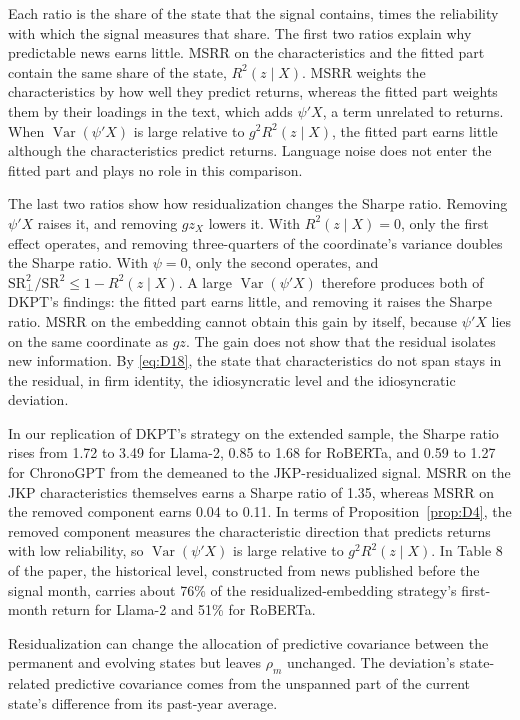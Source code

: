\documentclass[11pt,letterpaper]{article}
\theoremstyle{remark}
\DeclareMathOperator{\Var}{Var}
\begin{document}
Each ratio is the share of the state that the signal contains, times the reliability with which the signal measures that share. The first two ratios explain why predictable news earns little. MSRR on the characteristics and the fitted part contain the same share of the state, $R^2(z\mid X)$. MSRR weights the characteristics by how well they predict returns, whereas the fitted part weights them by their loadings in the text, which adds $\psi'X$, a term unrelated to returns. When $\Var(\psi'X)$ is large relative to $g^2R^2(z\mid X)$, the fitted part earns little although the characteristics predict returns. Language noise does not enter the fitted part and plays no role in this comparison.

The last two ratios show how residualization changes the Sharpe ratio. Removing $\psi'X$ raises it, and removing $gz_X$ lowers it. With $R^2(z\mid X)=0$, only the first effect operates, and removing three-quarters of the coordinate's variance doubles the Sharpe ratio. With $\psi=0$, only the second operates, and $\mathrm{SR}_\perp^2/\mathrm{SR}^2\le1-R^2(z\mid X)$. A large $\Var(\psi'X)$ therefore produces both of DKPT's findings: the fitted part earns little, and removing it raises the Sharpe ratio. MSRR on the embedding cannot obtain this gain by itself, because $\psi'X$ lies on the same coordinate as $gz$. The gain does not show that the residual isolates new information. By \eqref{eq:D18}, the state that characteristics do not span stays in the residual, in firm identity, the idiosyncratic level and the idiosyncratic deviation.

In our replication of DKPT's strategy on the extended sample, the Sharpe ratio rises from 1.72 to 3.49 for Llama-2, 0.85 to 1.68 for RoBERTa, and 0.59 to 1.27 for ChronoGPT from the demeaned to the JKP-residualized signal.
MSRR on the JKP characteristics themselves earns a Sharpe ratio of 1.35, whereas MSRR on the removed component earns 0.04 to 0.11.
In terms of Proposition~\ref{prop:D4}, the removed component measures the characteristic direction that predicts returns with low reliability, so $\Var(\psi'X)$ is large relative to $g^2R^2(z\mid X)$.
In Table 8 of the paper, the historical level, constructed from news published before the signal month, carries about 76\% of the residualized-embedding strategy's first-month return for Llama-2 and 51\% for RoBERTa.

Residualization can change the allocation of predictive covariance between the permanent and evolving states but leaves $\rho_m$ unchanged. The deviation's state-related predictive covariance comes from the unspanned part of the current state's difference from its past-year average.
\end{document}
